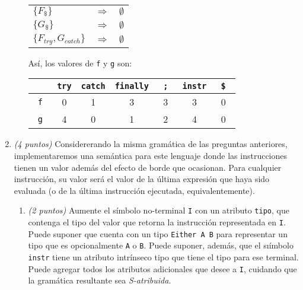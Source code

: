 \documentclass[a4paper,10pt]{article}
\begin{document}
\begin{enumerate}
\begin{enumerate}
\begin{center}
\begin{tabular}{ | l c l | }
                    & & \\ \hline
                    $\{F_{\$}\}$                    &  $\Longrightarrow$  & $\emptyset$ \\
                    $\{G_{\$}\}$                    &  $\Longrightarrow$  & $\emptyset$ \\
                    $\{F_{try}, G_{catch}\}$        &  $\Longrightarrow$  & $\emptyset$ \\
                    \hline
                \end{tabular}
            \end{center}

            As\'i, los valores de \verb|f| y \verb|g| son: \\

            \begin{center}
                \begin{tabular}{ | c | c | c | c | c | c | c |}
                    \hline
                    & \verb|try| & \verb|catch| & \verb|finally| & \verb| ; | & \verb|instr| & \verb| $ | \\ \hline
                    \verb| f | & 0 & 1 & 3 & 3 & 3 & 0 \\ \hline
                    \verb| g | & 4 & 0 & 1 & 2 & 4 & 0 \\ \hline 
                \end{tabular}
            \end{center}
            \vspace*{1,5cm}
        \end{enumerate}

        \item \textit{(4 puntos)} Considererando la misma gram\'atica de las preguntas anteriores, 
        implementaremos una sem\'antica para este lenguaje donde las instrucciones tienen un valor 
        adem\'as del efecto de borde que ocasionan. Para cualquier instrucción, su valor ser\'a el 
        valor de la \'ultima expresi\'on que haya sido evaluada (o de la \'ultima instrucci\'on 
        ejecutada, equivalentemente).

        \begin{enumerate}
            \item \textit{(2 puntos)} Aumente el s\'imbolo no-terminal \verb|I| con un atributo 
            \verb|tipo|, que contenga el tipo del valor que retorna la instrucci\'on representada 
            en \verb|I|. Puede suponer que cuenta con un tipo \verb|Either A B| para representar 
            un tipo que es opcionalmente \verb|A| o \verb|B|. Puede suponer, adem\'as, que el 
            sı\'imbolo \verb|instr| tiene un atributo intr\'inseco tipo que tiene el tipo para ese 
            terminal. Puede agregar todos los atributos adicionales que desee a \verb|I|, cuidando 
            que la gram\'atica resultante sea \textit{S-atribuida}.


\end{enumerate}
\end{enumerate}
\end{document}
